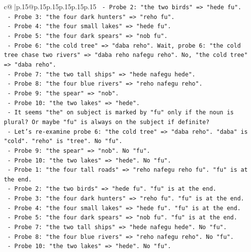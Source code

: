 \documentclass{article}
\begin{document}
{\begin{supertabular}{c@{$\;$}|p{.15\linewidth}@{}p{.15\linewidth}p{.15\linewidth}p{.15\linewidth}p{.15\linewidth}p{.15\linewidth}}
{{{\texttt{        {-} Probe 2: "the two birds" => "hede fu".} \\
\texttt{        {-} Probe 3: "the four dark hunters" => "reho fu".} \\
\texttt{        {-} Probe 4: "the four small lakes" => "hede fu".} \\
\texttt{        {-} Probe 5: "the four dark spears" => "nob fu".} \\
\texttt{        {-} Probe 6: "the cold tree" => "daba reho". Wait, probe 6: "the cold tree chase two rivers" => "daba reho nafegu reho". No, "the cold tree" => "daba reho".} \\
\texttt{        {-} Probe 7: "the two tall ships" => "hede nafegu hede".} \\
\texttt{        {-} Probe 8: "the four blue rivers" => "reho nafegu reho".} \\
\texttt{        {-} Probe 9: "the spear" => "nob".} \\
\texttt{        {-} Probe 10: "the two lakes" => "hede".} \\
\texttt{        {-} It seems "the" on subject is marked by "fu" only if the noun is plural? Or maybe "fu" is always on the subject if definite?} \\
\texttt{        {-} Let's re{-}examine probe 6: "the cold tree" => "daba reho". "daba" is "cold". "reho" is "tree". No "fu".} \\
\texttt{        {-} Probe 9: "the spear" => "nob". No "fu".} \\
\texttt{        {-} Probe 10: "the two lakes" => "hede". No "fu".} \\
\texttt{        {-} Probe 1: "the four tall roads" => "reho nafegu reho fu". "fu" is at the end.} \\
\texttt{        {-} Probe 2: "the two birds" => "hede fu". "fu" is at the end.} \\
\texttt{        {-} Probe 3: "the four dark hunters" => "reho fu". "fu" is at the end.} \\
\texttt{        {-} Probe 4: "the four small lakes" => "hede fu". "fu" is at the end.} \\
\texttt{        {-} Probe 5: "the four dark spears" => "nob fu". "fu" is at the end.} \\
\texttt{        {-} Probe 7: "the two tall ships" => "hede nafegu hede". No "fu".} \\
\texttt{        {-} Probe 8: "the four blue rivers" => "reho nafegu reho". No "fu".} \\
\texttt{        {-} Probe 10: "the two lakes" => "hede". No "fu".} \\
}}}
\end{supertabular}}
\end{document}
